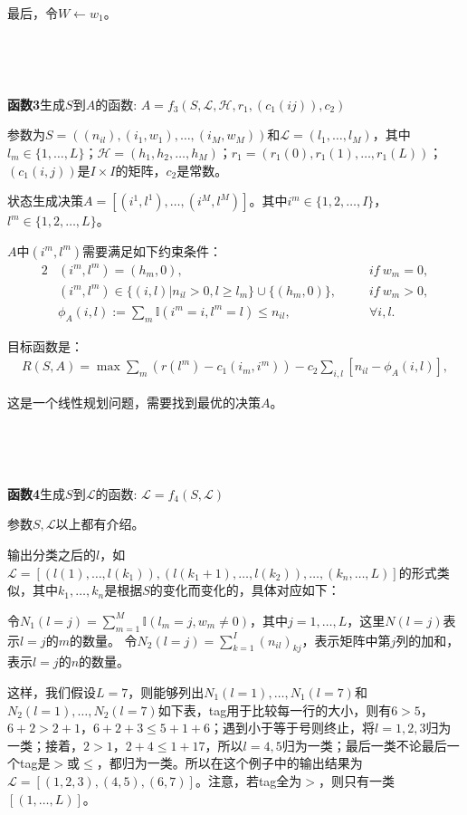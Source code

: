 \documentclass[a4paper,11pt]
{elsarticle}%
\begin{document}
最后，令$W\gets w_1$。

~

~


\textbf{函数3}生成$S$到$A$的函数: $A=f_3(S,\mathscr{L},\mathscr{H},r_1,(c_1(ij)),c_2)$

参数为$S=((n_{il}),(i_1,w_1),\ldots,(i_M,w_M))$和$\mathscr{L}=(l_1,\ldots,l_M)$，其中$l_m\in\{1,\ldots,L\}$；$\mathscr{H}=(h_1,h_2,\ldots,h_M)$；$r_1=(r_1(0),r_1(1),\ldots,r_1(L))$；$(c_1(i,j))$是$I\times I$的矩阵，$c_2$是常数。

状态生成决策$A=[(i^1,l^1),\ldots,(i^M,l^M)]$。其中$i^m\in\{1,2,\ldots,I\}$，$l^m\in\{1,2,\ldots,L\}$。

$A$中$(i^m,l^m)$需要满足如下约束条件：
\begin{alignat}{2}
&(i^m,l^m)=(h_m,0),~~~~~~ &if~ w_m=0, \label{s0-1}
\\
&(i^m,l^m)\in\{(i,l)|n_{il}>0,l\geq l_m\}\cup\{(h_m,0)\},~~~~~~~~&if~ w_m>0,   \label{s0-2}\\
&\phi_A(i,l):=\sum_{m}\mathbb{I}(i^m=i,l^m=l)\leq n_{il},~~~&\forall i,l.   \label{s0-3}
\end{alignat}

目标函数是：
\begin{align}\label{revenue}
R(S,A)=\max\sum\limits_{m}(r(l^m)-c_1(i_m,i^m))-c_2\sum\limits_{i,l}[n_{il}-\phi_A(i,l)],
\end{align}

这是一个线性规划问题，需要找到最优的决策$A$。


~


~

\textbf{函数4}生成$S$到$\mathcal{L}$的函数: $\mathcal{L}=f_4(S,\mathscr{L})$

参数$S,\mathscr{L}$以上都有介绍。

输出分类之后的$l$，如$\mathcal{L}=[(l(1),\ldots,l(k_1)),(l(k_1+1),\ldots,l(k_2)),\ldots,(k_n,\ldots,L)]$的形式类似，其中$k_1,\ldots,k_n$是根据$S$的变化而变化的，具体对应如下：

令$N_1(l=j)=\sum\limits_{m=1}^M\mathbb{I}(l_m=j,w_m\ne 0)$，其中$j=1,\ldots,L$，这里$N(l=j)$表示$l=j$的$m$的数量。
令$N_2(l=j)=\sum\limits_{k=1}^I(n_{il})_{kj}$，表示矩阵中第$j$列的加和，表示$l=j$的$n$的数量。

这样，我们假设$L=7$，则能够列出$N_1(l=1),\ldots,N_1(l=7)$和$N_2(l=1),\ldots,N_2(l=7)$如下表，tag用于比较每一行的大小，则有$6>5$，$6+2>2+1$，$6+2+3\leq 5+1+6$；遇到小于等于号则终止，将$l=1,2,3$归为一类；接着，$2>1$，$2+4\leq 1+17$，所以$l=4,5$归为一类；最后一类不论最后一个tag是$>$或$\leq$，都归为一类。所以在这个例子中的输出结果为$\mathcal{L}=[(1,2,3),(4,5),(6,7)]$。注意，若tag全为$>$，则只有一类$[(1,\ldots,L)]$。
\end{document}
